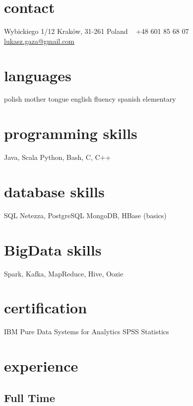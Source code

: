 \documentclass[]{gaza-cv} %
\begin{document}


\begin{aside} %
\section{contact}
Wybickiego 1/12
Kraków, 31-261
Poland
~
+48 601 85 68 07
~
\href{mailto:lukasz.gaza@gmail.com}{lukasz.gaza@gmail.com}
\section{languages}
polish mother tongue
english fluency
spanish elementary
\section{programming skills}
Java, Scala
Python, Bash, C, C++
\section{database skills}
SQL
Netezza, PostgreSQL
MongoDB, HBase (basics)
\section{BigData skills}
Spark, Kafka, MapReduce, Hive, Oozie
\section{certification}
IBM Pure Data Systems for Analytics
SPSS Statistics
\end{aside}


\section{experience}

\subsection{Full Time}
\end{document}
